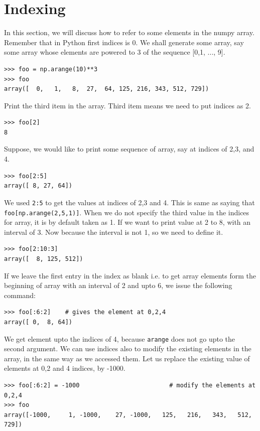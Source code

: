 \documentclass[10pt]{book}
\begin{document}
{\section{Indexing}
In this section, we will discuss how to refer to some elements in the numpy array. Remember that in Python first indices is 0. We shall generate some array, say some array whose elements are powered to 3 of the sequence [0,1, ..., 9].
\beforeverb \begin{verbatim}
>>> foo = np.arange(10)**3
>>> foo
array([  0,   1,   8,  27,  64, 125, 216, 343, 512, 729])
\end{verbatim} \afterverb
Print the third item in the array. Third item means we need to put indices as 2.
\beforeverb \begin{verbatim}
>>> foo[2]
8
\end{verbatim} \afterverb
Suppose, we would like to print some sequence of array, say at indices of 2,3, and 4.
\beforeverb \begin{verbatim}
>>> foo[2:5] 
array([ 8, 27, 64])     
\end{verbatim} \afterverb
We used \verb"2:5" to get the values at indices of 2,3 and 4. This is same as saying that \verb"foo[np.arange(2,5,1)]". When we do not specify the third value in the indices for array, it is by default taken as 1. If we want to print value at 2 to 8, with an interval of 3. Now because the interval is not 1, so we need to define it.
\beforeverb \begin{verbatim}
>>> foo[2:10:3]    
array([  8, 125, 512])
\end{verbatim} \afterverb
If we leave the first entry in the index as blank i.e. to get array elements form the beginning of array with an interval of 2 and upto 6, we issue the following command:
\beforeverb \begin{verbatim}
>>> foo[:6:2]    # gives the element at 0,2,4
array([ 0,  8, 64])
\end{verbatim} \afterverb
We get element upto the indices of 4, because \verb"arange" does not go upto the second argument. We can use indices also to modify the existing elements in the array, in the same way as we accessed them. Let us replace the existing value of elements at 0,2 and 4 indices, by -1000.
\beforeverb \begin{verbatim}
>>> foo[:6:2] = -1000                         # modify the elements at 0,2,4
>>> foo
array([-1000,     1, -1000,    27, -1000,   125,   216,   343,   512,   729])
\end{verbatim} \afterverb
}
\end{document}
